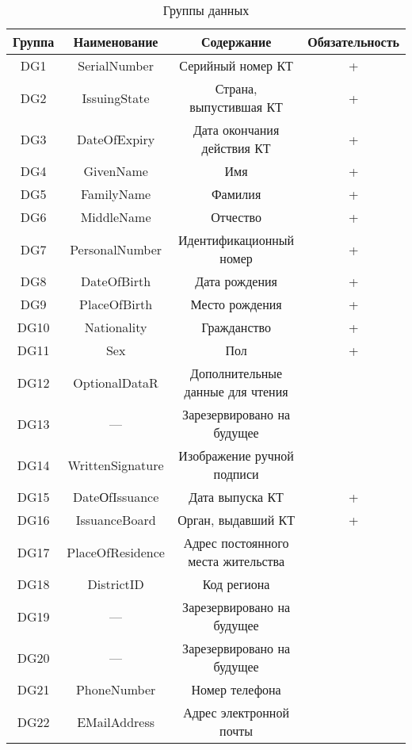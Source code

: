 \begin{table}[h!]
\caption{Группы данных}\label{Table.DATA.DG}
\begin{tabular}{|c|c|c|c|}
\hline
Группа & Наименование & Содержание & Обязательность\\
\hline
\hline
DG1 &	SerialNumber &	Серийный номер КТ  & +  \\
\hline
DG2 &	IssuingState &	Страна, выпустившая КТ & + \\
\hline
DG3 &	DateOfExpiry &	Дата окончания действия КТ & +  \\
\hline
DG4 &	GivenName   &	Имя & + \\
\hline
DG5 &	FamilyName &	Фамилия & + \\
\hline
DG6 &	MiddleName &	Отчество & + \\
\hline
DG7 &	PersonalNumber & Идентификационный номер & + \\
\hline
DG8 &	DateOfBirth &	Дата рождения & + \\
\hline
DG9 &	PlaceOfBirth &	Место рождения & + \\
\hline
DG10 & 	Nationality &	Гражданство & +\\
\hline
DG11 &	Sex 	  &  Пол  & + \\
\hline
DG12 &	OptionalDataR & Дополнительные данные для чтения & \\
\hline
DG13 &	--- &   Зарезервировано на будущее &  \\
\hline
DG14 &  WrittenSignature & Изображение ручной подписи & \\
\hline
DG15 &  DateОfIssuance & Дата выпуска КТ  & + \\
\hline
DG16 &  IssuanceBoard & Орган, выдавший КТ  & + \\
\hline
DG17 &	PlaceOfResidence &   Адрес постоянного места жительства & \\
\hline
DG18 &	DistrictID 	 &   Код региона &  \\
\hline
DG19 &	--- &	Зарезервировано на будущее & \\
\hline
DG20 &	--- & 	Зарезервировано на будущее & \\
\hline
DG21 &	PhoneNumber & Номер телефона & \\
\hline
DG22 &	EMailAddress & Адрес электронной почты & \\
\hline
\end{tabular}
\end{table}
                         
